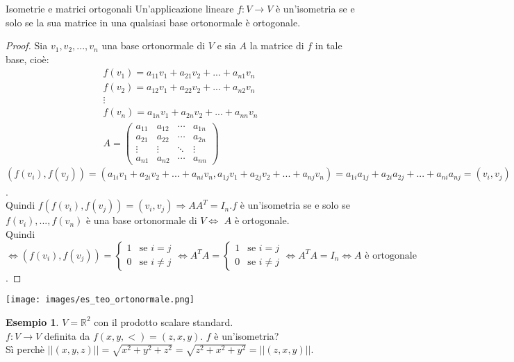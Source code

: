 \documentclass[a4paper]{article}
\theoremstyle{definition}
\newtheorem*{es}{Esempio}
\begin{document}
	\begin{teo}{Isometrie e matrici ortogonali}
		Un'applicazione lineare $f: V \to V$ è un'isometria se e solo se la sua matrice in una qualsiasi base ortonormale è ortogonale.
	\end{teo}
	\begin{proof}
		Sia $v_1, v_2, ..., v_n$ una base ortonormale di $V$ e sia $A$ la matrice di $f$ in tale base, cioè:
		\begin{align*}
			f(v_1) = a_{11}v_1 + a_{21}v_2 + ... + a_{n1}v_n \\
			f(v_2) = a_{12}v_1 + a_{22}v_2 + ... + a_{n2}v_n \\
			\vdots \\
			f(v_n) = a_{1n}v_1 + a_{2n}v_2 + ... + a_{nn}v_n \\
			A = \begin{pmatrix}
				a_{11} & a_{12} & \cdots & a_{1n} \\
				a_{21} & a_{22} & \cdots & a_{2n} \\
				\vdots & \vdots & \ddots & \vdots \\
				a_{n1} & a_{n2} & \cdots & a_{nn}
			\end{pmatrix}
		\end{align*}
		$(f(v_i), f(v_j)) = (a_{1i}v_1 + a_{2i}v_2 + ... + a_{ni}v_n, a_{1j}v_1 + a_{2j}v_2 + ... + a_{nj}v_n) = a_{1i}a_{1j} + a_{2i}a_{2j} + ... + a_{ni}a_{nj} = (v_i, v_j) = (AA^T)_{ij}$. \\
		Quindi $f(f(v_i), f(v_j)) = (v_i, v_j) \Rightarrow AA^T = I_n. f$ è un'isometria se e solo se $f(v_i), ..., f(v_n)$ è una base ortonormale di $V \Leftrightarrow$ $A$ è ortogonale. \\
		Quindi $\Leftrightarrow (f(v_i), f(v_j)) = \begin{cases}
			1 & \text{se } i = j \\
			0 & \text{se } i \ne j
		\end{cases} \Leftrightarrow A^TA = \begin{cases}
			1 & \text{se } i = j \\
			0 & \text{se } i \ne j
		\end{cases} \Leftrightarrow A^TA = I_n \Leftrightarrow A \text{ è ortogonale}$.
	\end{proof}
	
	\begin{center}
		\texttt{[image: images/es\_teo\_ortonormale.png]}
	\end{center}
	\begin{es}
		$V = \mathbb{R}^2$ con il prodotto scalare standard. \\
		$f: V \to V$ definita da $f(x, y, <) = (z, x, y)$. $f$ è un'isometria? \\
		Sì perchè $||(x, y, z)|| = \sqrt{x^2 + y^2 + z^2} = \sqrt{z^2 + x^2 + y^2} = ||(z, x, y)||$.
	\end{es}
\end{document}
